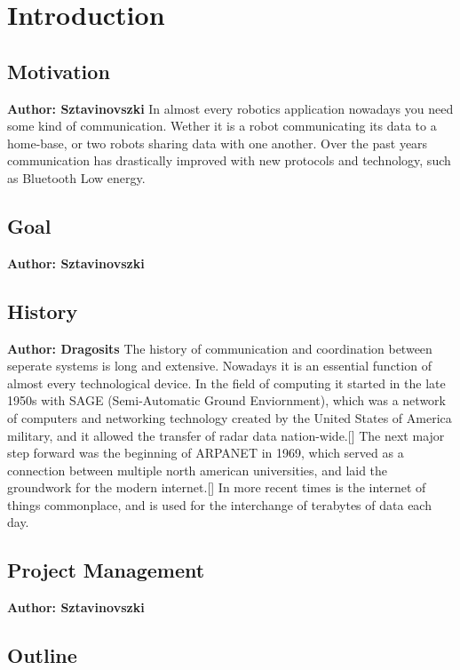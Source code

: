 \chapter{Introduction}


\vspace{2mm}

\section{Motivation}
\textbf{Author: Sztavinovszki}
In almost every robotics application nowadays you need some kind of communication. Wether it is a robot communicating
its data to a home-base, or two robots sharing data with one another. Over the past years communication has drastically
improved with new protocols and technology, such as Bluetooth Low energy.

\section{Goal}
\textbf{Author: Sztavinovszki}

\section{History}
\textbf{Author: Dragosits}
The history of communication and coordination between seperate systems is long and extensive. Nowadays it is an essential 
function of almost every technological device. In the field of computing it started in the late 1950s with SAGE (Semi-Automatic Ground Enviornment),
which was a network of computers and networking technology created by the United States of America military, 
and it allowed the transfer of radar data nation-wide.[]
The next major step forward was the beginning of ARPANET in 1969, which served as a connection between multiple north american 
universities, and laid the groundwork for the modern internet.[] 
In more recent times is the internet of things commonplace, and is used for the interchange of terabytes of data each day.

\section{Project Management}
\textbf{Author: Sztavinovszki}

\section{Outline}

